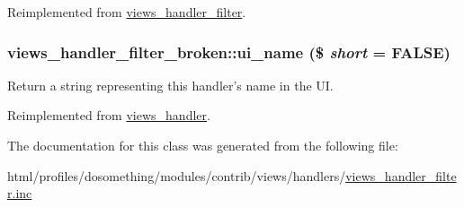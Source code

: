 Reimplemented from \hyperlink{classviews__handler__filter_af14c69367162057a32709a6340de0988}{views\_\-handler\_\-filter}.\hypertarget{classviews__handler__filter__broken_a199df5434e076ecc6889082a83f2e266}{
\subsubsection[{ui\_\-name}]{\setlength{\rightskip}{0pt plus 5cm}views\_\-handler\_\-filter\_\-broken::ui\_\-name (\$ {\em short} = {\ttfamily FALSE})}}
\label{classviews__handler__filter__broken_a199df5434e076ecc6889082a83f2e266}
Return a string representing this handler's name in the UI. 

Reimplemented from \hyperlink{classviews__handler_ae81019ed08d9c3f5bca3d16c69e7b39f}{views\_\-handler}.

The documentation for this class was generated from the following file:\begin{DoxyCompactItemize}
\item 
html/profiles/dosomething/modules/contrib/views/handlers/\hyperlink{views__handler__filter_8inc}{views\_\-handler\_\-filter.inc}\end{DoxyCompactItemize}
